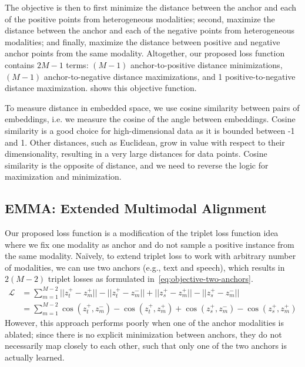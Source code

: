 \documentclass[sigconf,natbib=true,anonymous=true]{acmart}
\begin{document}
The objective is then to first minimize the distance between the anchor and each of the positive points from heterogeneous modalities; second, maximize the distance between the anchor and each of the negative points from heterogeneous modalities; and finally, maximize the distance between positive and negative anchor points from the same modality. Altogether, our proposed loss function contains $2M-1$ terms: $(M-1)$ anchor-to-positive distance minimizations, $(M-1)$ anchor-to-negative distance maximizations, and 1 positive-to-negative distance maximization.  shows this objective function.

To measure distance in embedded space, we use cosine similarity between pairs of embeddings, i.e. we measure the cosine of the angle between embeddings. Cosine similarity is a good choice for high-dimensional data as it is bounded between -1 and 1. Other distances, such as Euclidean, grow in value with respect to their dimensionality, resulting in a very large distances for data points. Cosine similarity is the opposite of distance, and we need to reverse the logic for maximization and minimization.

\subsection{EMMA: Extended Multimodal Alignment}
\label{sub:emma}
Our proposed loss function is a modification of the triplet loss function idea where we fix one modality as anchor and do not sample a positive instance from the same modality. 
Na\"ively, to extend triplet loss to work with arbitrary number of modalities, we can use two anchors (e.g., text and speech), which results in $2(M-2)$ triplet losses as formulated in~\cref{eq:objective-two-anchors}. 
\begin{equation}
\label{eq:objective-two-anchors}
\begin{split}
    \mathcal{L}  &= \sum_{m=1}^{M-2} || z_{t}^{+} - z_{m}^{+} || - || z_{t}^{+} - z_{m}^{-} || + || z_{s}^{+} - z_{m}^{+} || - || z_{s}^{+} - z_{m}^{-} || \\
    &= \sum_{m=1}^{M-2} \cos(z_{t}^{+} ,z_{m}^{-}) - \cos(z_{t}^{+}, z_{m}^{+}) + \cos(z_{s}^{+} ,z_{m}^{-}) - \cos(z_{s}^{+}, z_{m}^{+})
\end{split}
\end{equation}
However, this approach performs poorly when one of the anchor modalities is ablated; since there is no explicit minimization between anchors, they do not necessarily map closely to each other, such that only one of the two anchors is actually learned. 
\end{document}
